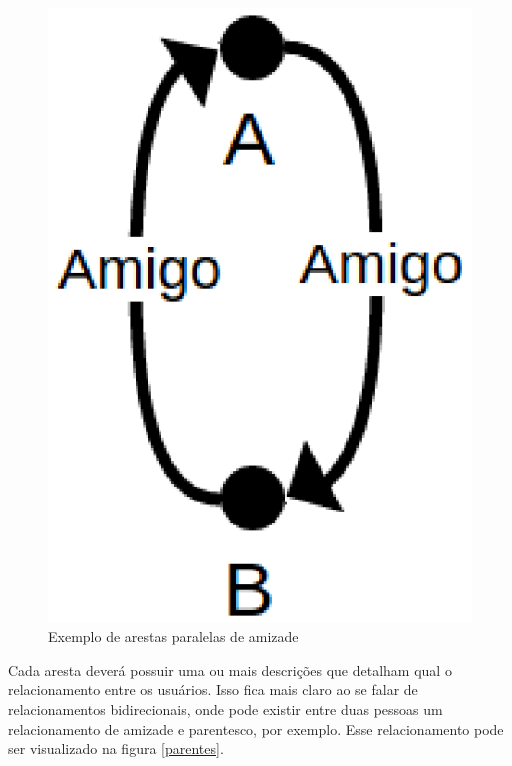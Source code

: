 \begin{figure}[!h]
	\centering
	\includegraphics[scale=0.45]{figuras/capitulo5/amigo.eps}
	\caption{Exemplo de arestas paralelas de amizade}
	\label{amigo}
\end{figure}

Cada aresta deverá possuir uma ou mais descrições que detalham qual o relacionamento entre os usuários. Isso fica mais claro ao se falar de relacionamentos bidirecionais, onde pode existir entre duas pessoas um relacionamento de amizade e parentesco, por exemplo. Esse relacionamento pode ser visualizado na figura \ref{parentes}.

\newpage


